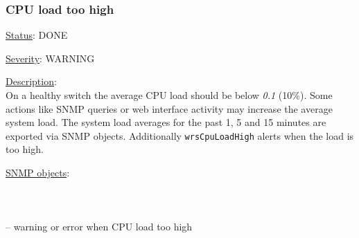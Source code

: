 \subsubsection{\bf CPU load too high}
		\label{fail:other:cpu}
		\begin{pck_descr}
			\item [] \underline{Status}: DONE
			\item [] \underline{Severity}: WARNING
			\item [] \underline{Description}:\\
        On a healthy switch the average CPU load should be below \emph{0.1} (10\%).
				Some actions like SNMP queries or web interface activity may increase
				the average system load. The system load averages for the past 1, 5 and
				15 minutes are exported via SNMP objects. Additionally
				\texttt{wrsCpuLoadHigh} alerts when the load is too high.
			\item [] \underline{SNMP objects}:\\
        {\footnotesize
        \\
				\\
				\\
				 -- warning or error when CPU load too high\\
				\\
         }
		\end{pck_descr}

